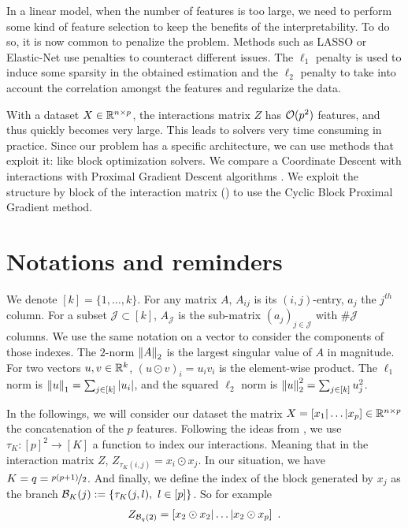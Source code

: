 \documentclass[../main.tex]{subfiles}
\begin{document}
In a linear model, when the number of features is too large, we need to perform
some kind of feature selection to keep the benefits of the interpretability.
To do so, it is now common to penalize the problem.
Methods such as LASSO \citep{Tibshirani96} or Elastic-Net \citep{Zou_Hastie05}
use penalties to counteract different issues.
The $\ell_1$ penalty is used to induce some sparsity in the obtained estimation
and the $\ell_2$ penalty to take into account the correlation amongst the
features and regularize the data.

\medskip

With a dataset $X\in\mathbb{R}^{n\times p}$, the interactions matrix $Z$ has
$\mathcal{O}(p^2)$ features, and thus quickly becomes very large.
This leads to solvers very time consuming in practice.
Since our problem has a specific architecture, we can use methods
that exploit it: like block optimization solvers.
We compare a Coordinate Descent with interactions \citep{Bascou_Lebre_Salmon20}
with Proximal Gradient Descent algorithms \citep{Beck17}.
We exploit the structure by block of the interaction matrix ()
to use the Cyclic Block Proximal Gradient method.


\section{Notations and reminders}

We denote $[k]=\{1, \dots, k\}$.
For any matrix $A$, $A_{ij}$ is its $(i,j)$-entry, $a_j$ the $j^{th}$ column.
For a subset $\mathcal{J} \subset [k]$, $A_{\mathcal{J}}$ is the sub-matrix
$(a_j)_{j\in \mathcal{J}}$ with $\#\mathcal{J}$ columns.
We use the same notation on a vector to consider the components of those indexes.
The $2$-norm $\left \lVert A \right \rVert_2$ is the largest singular value of $A$ in magnitude.
For two vectors $u,v\in\mathbb{R}^k$, $(u\odot v)_i=u_iv_i$ is the
element-wise product. The $\ell_1$ norm is $\left \lVert u \right \rVert_1=\sum_{j\in[k]}\left \vert u_i \right \vert$,
and the squared $\ell_2$ norm is $\left \lVert u \right \rVert_2^2 = \sum_{j\in[k]} u_j^2$.

\medskip

In the followings, we will consider our dataset the matrix
$X=[x_1|\dots| x_p]\in\mathbb{R}^{n\times p}$ the concatenation of the $p$ features.
Following the ideas from \citep{le2018whinter}, we use
$\tau_K : [p]^2 \longrightarrow [K]$ a function to index our interactions.
Meaning that in the interaction matrix $Z$, $Z_{\tau_K(i,j)} = x_i\odot x_j$.
In our situation, we have $K=q=\nicefrac{p(p+1)}{2}$.
And finally, we define the index of the block generated by $x_j$ as the branch
$\branch{K}{j}:=\{\tau_K(j,l),\ l\in [p]\}$.
So for example
\begin{align*}
Z_{\mathcal{B}_{q}(2)}=[x_2\odot x_2| \dots| x_2\odot x_p] \enspace.
\end{align*}
\end{document}
